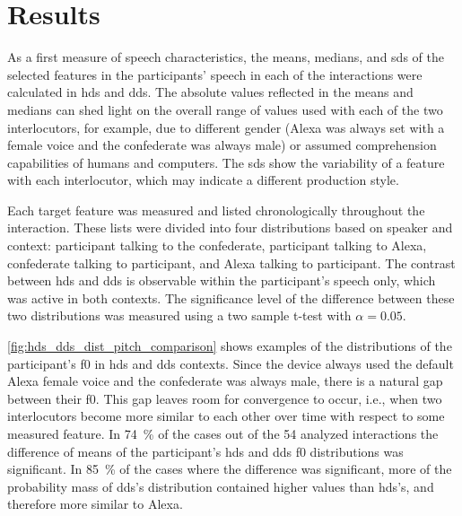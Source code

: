 \section{Results}
\label{sec:results}

As a first measure of speech characteristics, the means, medians, and \aclp{sd} of the selected features in the participants' speech in each of the interactions were calculated in \ac{hds} and \ac{dds}.
The absolute values reflected in the means and medians can shed light on the overall range of values used with each of the two interlocutors,
for example, due to different gender (Alexa was always set with a female voice and the confederate was always male) or assumed comprehension capabilities of humans and computers.
The \aclp{sd} show the variability of a feature with each interlocutor, which may indicate a different production style.

Each target feature was measured and listed chronologically throughout the interaction.
These lists were divided into four distributions based on speaker and context: participant talking to the confederate, participant talking to Alexa, confederate talking to participant, and Alexa talking to participant.
The contrast between \ac{hds} and \ac{dds} is observable within the participant's speech only, which was active in both contexts.
The significance level of the difference between these two distributions was measured using a two sample t-test with $\alpha=0.05$.

\cref{fig:hds_dds_dist_pitch_comparison} shows examples of the distributions of the participant's \ac{f0} in \ac{hds} and \ac{dds} contexts.
Since the device always used the default Alexa female voice and the confederate was always male, there is a natural gap between their \ac{f0}.
This gap leaves room for convergence to occur, i.e., when two interlocutors become more similar to each other over time with respect to some measured feature.
In \SI{74}{\percent} of the cases out of the 54 analyzed interactions the difference of means of the participant's \ac{hds} and \ac{dds} \ac{f0} distributions was significant.
In \SI{85}{\percent} of the cases where the difference was significant, more of the probability mass of \ac{dds}'s distribution contained higher values than \ac{hds}'s, and therefore more similar to Alexa.

